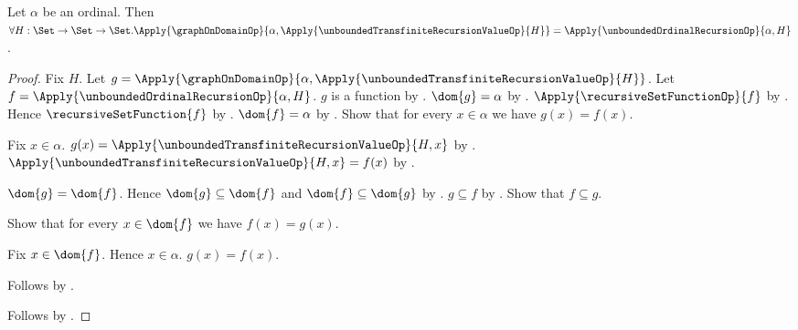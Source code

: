 \begin{theorem}\label{unbounded_transfinite_recursion_graph}
    Let $\alpha$ be an ordinal.
    Then $\forall H:\Set\to\Set\to\Set.
        \Apply{\graphOnDomainOp}
            {\alpha,\Apply{\unboundedTransfiniteRecursionValueOp}{H}}
        =\Apply{\unboundedOrdinalRecursionOp}{\alpha,H}$.
\end{theorem}
\begin{proof}
    Fix $H$.
    Let $g=\Apply{\graphOnDomainOp}
        {\alpha,\Apply{\unboundedTransfiniteRecursionValueOp}{H}}$.
    Let $f=\Apply{\unboundedOrdinalRecursionOp}{\alpha,H}$.
    $g$ is a function by
        .
    $\dom{g}=\alpha$ by .
    $\Apply{\recursiveSetFunctionOp}{f}$ by
        .
    Hence $\recursiveSetFunction{f}$ by
        .
    $\dom{f}=\alpha$ by .
    Show that for every $x\in\alpha$ we have $g(x)=f(x)$.
    \begin{subproof}
        Fix $x\in\alpha$.
        $g(x)=\Apply{\unboundedTransfiniteRecursionValueOp}{H,x}$ by
            .
        $\Apply{\unboundedTransfiniteRecursionValueOp}{H,x}
            =f(x)$ by
            .
    \end{subproof}
    $\dom{g}=\dom{f}$.
    Hence $\dom{g}\subseteq\dom{f}$ and
        $\dom{f}\subseteq\dom{g}$ by .
    $g\subseteq f$ by .
    Show that $f\subseteq g$.
    \begin{subproof}
        Show that for every $x\in\dom{f}$ we have $f(x)=g(x)$.
        \begin{subproof}
            Fix $x\in\dom{f}$.
            Hence $x\in\alpha$.
            $g(x)=f(x)$.
        \end{subproof}
        Follows by .
    \end{subproof}
    Follows by .
\end{proof}

